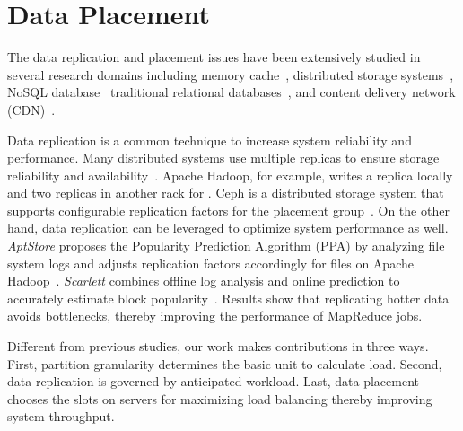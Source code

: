 \section{Data Placement}
The data replication and placement issues have been extensively studied
in several research domains
including memory cache~\cite{Leff1993,Zaman2011},
distributed storage systems~\cite{Lim2010},
NoSQL database~\cite{Rodrigues2013,Cruz2013,Corbett2013}
traditional relational databases~\cite{Pavlo2012,Curino2010}, and
content delivery network (CDN)~\cite{Laoutaris2006}.

Data replication is a common technique to increase
system reliability and performance.
Many distributed systems use multiple replicas to
ensure storage reliability and availability~\cite{hbase,SageWeil2006Ceph}.
Apache Hadoop, for example, writes a replica locally and
two replicas in another rack for .
Ceph is a distributed storage system
that supports configurable replication factors
for the placement group~\cite{SageWeil2006Ceph}.
On the other hand, data replication can be leveraged to optimize
system performance as well.
\emph{AptStore} proposes the Popularity Prediction Algorithm (PPA) by
analyzing file system logs and adjusts replication factors accordingly
for files on Apache Hadoop~\cite{Krish2013}.
\emph{Scarlett} combines offline log analysis and online prediction to
accurately estimate block popularity~\cite{Ananthanarayanan2011}.
Results show that replicating hotter data avoids bottlenecks,
thereby improving the performance of MapReduce jobs.



Different from previous studies,
our work makes contributions in three ways.
First, partition granularity determines the basic unit to calculate load.
Second, data replication is governed by anticipated workload.
Last, data placement chooses the slots on servers for maximizing
load balancing thereby improving system throughput.

